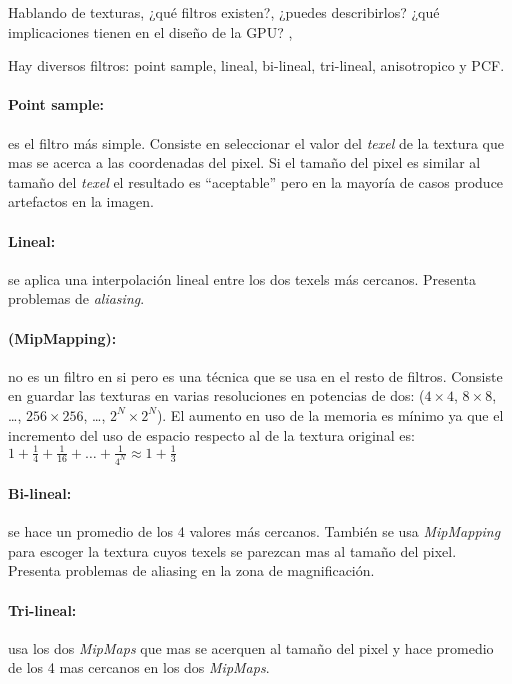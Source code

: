 \begin{pregunta}{Hablando de texturas, ¿qué filtros existen?, ¿puedes describirlos? ¿qué
implicaciones tienen en el diseño de la GPU?} \sep{}

Hay diversos filtros: point sample, lineal, bi-lineal, tri-lineal,
anisotropico y PCF.  \cite{heckbert_survey_1986}

\paragraph{Point sample:} es el filtro más simple. Consiste en seleccionar el valor del
\emph{texel} de la textura que mas se acerca a las coordenadas del pixel. Si el tamaño
del pixel es similar al tamaño del \emph{texel} el resultado es ``aceptable''
pero en la mayoría de casos produce artefactos en la imagen.

\paragraph{Lineal:} se aplica una interpolación lineal entre los dos texels más
cercanos. Presenta problemas de \emph{aliasing}.

\paragraph{(MipMapping):} no es un filtro en si pero es una técnica que se usa
en el resto de filtros. Consiste en guardar las texturas en varias resoluciones
en potencias de dos: ($4\times4$, $8\times8$, \dots, $256\times256$, \dots,
$2^N\times2^N$). El
aumento en uso de la memoria es mínimo ya que el incremento del uso de espacio
respecto al de la textura original es:
$1 + \frac{1}{4} + \frac{1}{16} +\dots + \frac{1}{4^N} \approx 1 + \frac{1}{3}$

\paragraph{Bi-lineal:} se hace un promedio de los 4 valores más cercanos.
También se usa \emph{MipMapping} para escoger la textura cuyos texels se
parezcan mas al tamaño del pixel. Presenta problemas de aliasing en la zona de
magnificación.

\paragraph{Tri-lineal:} usa los dos \emph{MipMaps} que mas se acerquen al tamaño
del pixel y hace promedio de los 4 mas cercanos en los dos \emph{MipMaps}.


\end{pregunta}
